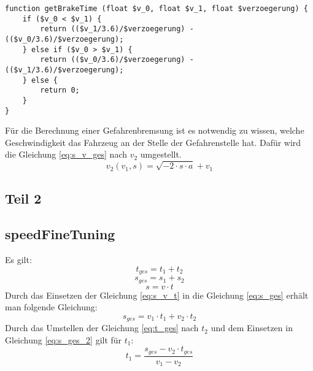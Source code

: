 \begin{lstlisting}
function getBrakeTime (float $v_0, float $v_1, float $verzoegerung) {
	if ($v_0 < $v_1) {
		return (($v_1/3.6)/$verzoegerung) - (($v_0/3.6)/$verzoegerung);
	} else if ($v_0 > $v_1) {
		return (($v_0/3.6)/$verzoegerung) - (($v_1/3.6)/$verzoegerung);
	} else {
		return 0;
	}
}
\end{lstlisting}
Für die Berechnung einer Gefahrenbremsung ist es notwendig zu wissen, welche Geschwindigkeit das Fahrzeug an der Stelle der Gefahrenstelle hat. Dafür wird die Gleichung \eqref{eq:s_v_ges} nach $v_{2}$ umgestellt.
\begin{equation}
v_{2}(v_{1}, s) = \sqrt{-2 \cdot s \cdot a} + v_{1}
\end{equation}
\subsection{Teil 2}
\subsection{speedFineTuning}
Es gilt:
\begin{equation}
\label{eq:t_ges}
t_{ges} = t_{1} + t_{2}
\end{equation}
\begin{equation}
\label{eq:s_ges}
s_{ges} = s_{1} + s_{2}
\end{equation}
\begin{equation}
\label{eq:s_v_t}
s = v \cdot t
\end{equation}
Durch das Einsetzen der Gleichung \eqref{eq:s_v_t} in die Gleichung \eqref{eq:s_ges} erhält man folgende Gleichung:
\begin{equation}
\label{eq:s_ges_2}
s_{ges} = v_{1} \cdot t_{1} + v_{2} \cdot t_{2}
\end{equation}
Durch das Umstellen der Gleichung \eqref{eq:t_ges} nach $t_{2}$ und dem Einsetzen in Gleichung \eqref{eq:s_ges_2} gilt für $t_{1}$:
\begin{equation}
t_{1} = \frac{s_{ges} - v_{2} \cdot t_{ges}}{v_{1} - v_{2}}
\end{equation}














